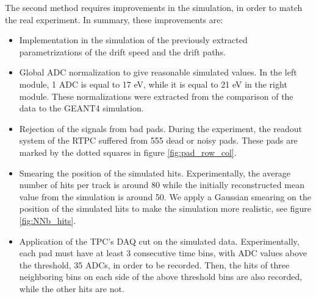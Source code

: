 The second method requires improvements in the simulation, in order to 
match the real experiment. In summary, these improvements are:
\begin{itemize}
\item Implementation in the simulation of the previously extracted 
   parametrizations of the drift speed and the drift paths.
\item Global ADC normalization to give reasonable simulated values. In the left 
   module, 1 ADC is equal to 17 eV, while it is equal to 21 eV in the right 
   module. These normalizations were extracted from the comparison of the data 
   to the GEANT4 simulation.
\item Rejection of the signals from bad pads. During the experiment, the 
   readout system of the RTPC suffered from 555 dead or noisy pads. These pads 
   are marked by the dotted squares in figure \ref{fig:pad_row_col}.
\item Smearing the position of the simulated hits. Experimentally, the average 
   number of hits per track is around 80 while the initially reconstructed mean 
   value from the simulation is around 50. We apply a Gaussian smearing on the 
   position of the simulated hits to make the simulation more realistic, see 
   figure \ref{fig:NNb_hits}.  
\item Application of the TPC's DAQ cut on the simulated data. Experimentally, 
   each pad must have at least 3 consecutive time bins, with ADC values above 
   the threshold, 35 ADCs, in order to be recorded. Then, the hits of three 
   neighboring bins on each side of the above threshold bins are also recorded, 
   while the other hits are not.
\end{itemize} 

